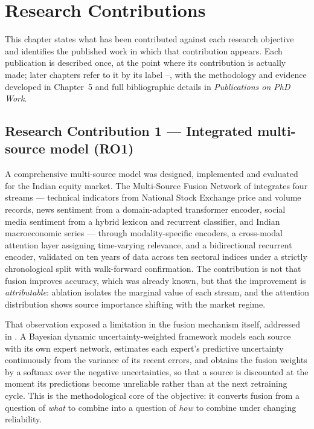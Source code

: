 \chapter{Research Contributions}

This chapter states what has been contributed against each research objective and identifies the
published work in which that contribution appears. Each publication is described once, at the
point where its contribution is actually made; later chapters refer to it by its label
--, with the methodology and evidence developed in Chapter~5 and full
bibliographic details in \emph{Publications on PhD Work}.

\section{Research Contribution 1 --- Integrated multi-source model (RO1)}

A comprehensive multi-source model was designed, implemented and evaluated for the Indian
equity market. The Multi-Source Fusion Network of  integrates four streams ---
technical indicators from National Stock Exchange price and volume records, news sentiment from
a domain-adapted transformer encoder, social media sentiment from a hybrid lexicon and
recurrent classifier, and Indian macroeconomic series --- through modality-specific encoders, a
cross-modal attention layer assigning time-varying relevance, and a bidirectional recurrent
encoder, validated on ten years of data across ten sectoral indices under a strictly
chronological split with walk-forward confirmation. The contribution is not that fusion
improves accuracy, which was already known, but that the improvement is \emph{attributable}:
ablation isolates the marginal value of each stream, and the attention distribution shows
source importance shifting with the market regime.

That observation exposed a limitation in the fusion mechanism itself, addressed in
. A Bayesian dynamic uncertainty-weighted framework models each source with its own
expert network, estimates each expert's predictive uncertainty continuously from the variance of
its recent errors, and obtains the fusion weights by a softmax over the negative uncertainties,
so that a source is discounted at the moment its predictions become unreliable rather than at
the next retraining cycle. This is the methodological core of the objective: it converts fusion
from a question of \emph{what} to combine into a question of \emph{how} to combine under
changing reliability.

